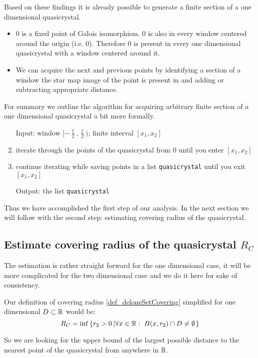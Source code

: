 \documentclass[text.tex]{subfiles}
\begin{document}
Based on these findings it is already possible to generate a finite section of a one dimensional quasicrystal. 
\begin{itemize}
\item $0$ is a fixed point of Galois isomorphism. $0$ is also in every window centered around the origin (i.e. $0$). Therefore $0$ is present in every one dimensional quasicrystal with a window centered around it. 
\item We can acquire the next and previous points by identifying a section of a window the star map image of the point is present in and adding or subtracting appropriate distance. 
\end{itemize}

For summary we outline the algorithm for acquiring arbitrary finite section of a one dimensional quasicrystal a bit more formally. 

\begin{enumerate}
\item[Input:] window $[-\frac{\ell}{2},\frac{\ell}{2})$; finite interval $[x_1,x_2]$
\item iterate through the points of the quasicrystal from $0$ until you enter $[x_1,x_2]$
\item continue iterating while saving points in a list \texttt{quasicrystal} until you exit $[x_1,x_2]$
\item[Output:] the list \texttt{quasicrystal}
\end{enumerate}

Thus we have accomplished the first step of our analysis. In the next section we will follow with the second step: estimating covering radius of the quasicrystal. 

\subsection{Estimate covering radius of the quasicrystal $R_C$}
The estimation is rather straight forward for the one dimensional case, it will be more complicated for the two dimensional case and we do it here for sake of consistency. 

Our definition of covering radius \ref{def_deloneSetCovering} simplified for one dimensional $D\subset\mathbb{R}$ would be: 
$$R_C = \inf\left\{ r_2>0\left| \forall x\in\mathbb{R}:\; B(x,r_2)\cap D \neq \emptyset \right. \right\}$$

So we are looking for the upper bound of the largest possible distance to the nearest point of the quasicrystal from anywhere in $\mathbb{R}$. 
\end{document}
